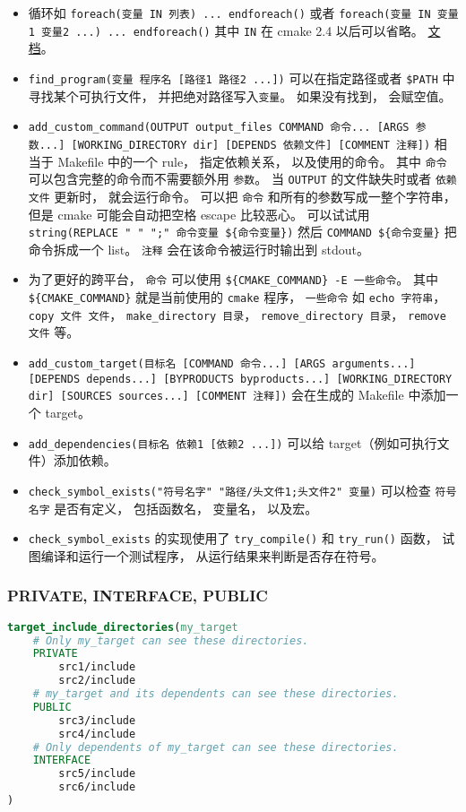 \begin{itemize}
\item 循环如 \verb`foreach(变量 IN 列表) ... endforeach()` 或者 \verb`foreach(变量 IN 变量1 变量2 ...) ... endforeach()` 其中 \verb`IN` 在 cmake 2.4 以后可以省略。 \href{https://cmake.org/cmake/help/latest/command/foreach.html}{文档}。
\item \verb`find_program(变量 程序名 [路径1 路径2 ...])` 可以在指定路径或者 \verb`$PATH` 中寻找某个可执行文件， 并把绝对路径写入\verb`变量`。 如果没有找到， 会赋空值。
\item \verb`add_custom_command(OUTPUT output_files COMMAND 命令... [ARGS 参数...] [WORKING_DIRECTORY dir] [DEPENDS 依赖文件] [COMMENT 注释])` 相当于 Makefile 中的一个 rule， 指定依赖关系， 以及使用的命令。 其中 \verb`命令` 可以包含完整的命令而不需要额外用 \verb`参数`。 当 \verb`OUTPUT` 的文件缺失时或者 \verb`依赖文件` 更新时， 就会运行命令。 可以把 \verb`命令` 和所有的参数写成一整个字符串， 但是 cmake 可能会自动把空格 escape 比较恶心。 可以试试用 \verb`string(REPLACE " " ";" 命令变量 ${命令变量})` 然后 \verb`COMMAND ${命令变量}` 把命令拆成一个 list。 \verb`注释` 会在该命令被运行时输出到 stdout。
\item 为了更好的跨平台， \verb`命令` 可以使用 \verb`${CMAKE_COMMAND} -E 一些命令`。 其中 \verb`${CMAKE_COMMAND}` 就是当前使用的 \verb`cmake` 程序， \verb`一些命令` 如 \verb`echo 字符串`，\verb`copy 文件 文件`， \verb`make_directory 目录`， \verb`remove_directory 目录`， \verb`remove 文件` 等。
\item \verb`add_custom_target(目标名 [COMMAND 命令...] [ARGS arguments...] [DEPENDS depends...] [BYPRODUCTS byproducts...] [WORKING_DIRECTORY dir] [SOURCES sources...] [COMMENT 注释])` 会在生成的 Makefile 中添加一个 target。
\item \verb`add_dependencies(目标名 依赖1 [依赖2 ...])` 可以给 target（例如可执行文件）添加依赖。
\item \verb`check_symbol_exists("符号名字" "路径/头文件1;头文件2" 变量)` 可以检查 \verb`符号名字` 是否有定义， 包括函数名， 变量名， 以及宏。
\item \verb`check_symbol_exists` 的实现使用了 \verb`try_compile()` 和 \verb`try_run()` 函数， 试图编译和运行一个测试程序， 从运行结果来判断是否存在符号。
\end{itemize}

\subsubsection{PRIVATE, INTERFACE, PUBLIC}
\begin{lstlisting}[language=cmake]
target_include_directories(my_target
    # Only my_target can see these directories.
    PRIVATE
        src1/include
        src2/include
    # my_target and its dependents can see these directories.
    PUBLIC
        src3/include
        src4/include
    # Only dependents of my_target can see these directories.
    INTERFACE
        src5/include
        src6/include
)
\end{lstlisting}

